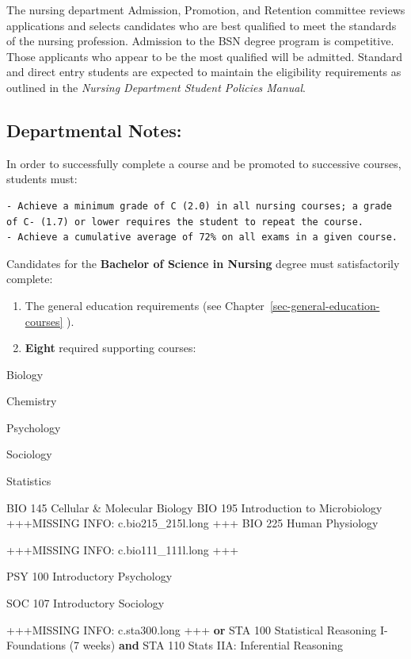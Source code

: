 \documentclass[
  letterpaper,
]{scrbook}
\begin{document}
The nursing department Admission, Promotion, and Retention committee
reviews applications and selects candidates who are best qualified to
meet the standards of the nursing profession. Admission to the BSN
degree program is competitive. Those applicants who appear to be the
most qualified will be admitted. Standard and direct entry students are
expected to maintain the eligibility requirements as outlined in the
\emph{Nursing Department Student Policies Manual}.

\subsection{Departmental Notes:}\label{departmental-notes-1}

In order to successfully complete a course and be promoted to successive
courses, students must:

\begin{verbatim}
- Achieve a minimum grade of C (2.0) in all nursing courses; a grade of C- (1.7) or lower requires the student to repeat the course.
- Achieve a cumulative average of 72% on all exams in a given course.
\end{verbatim}

Candidates for the \textbf{Bachelor of Science in Nursing} degree must
satisfactorily complete:

\begin{enumerate}
\def\labelenumi{\arabic{enumi}.}
\item
  The general education requirements (see
  Chapter~\ref{sec-general-education-courses} ).
\item
  \textbf{Eight} required supporting courses:
\end{enumerate}

Biology

Chemistry

Psychology

Sociology

Statistics

BIO 145 Cellular \& Molecular Biology BIO 195 Introduction to
Microbiology +++MISSING INFO: c.bio215\_215l.long +++ BIO 225 Human
Physiology

+++MISSING INFO: c.bio111\_111l.long +++

PSY 100 Introductory Psychology

SOC 107 Introductory Sociology

+++MISSING INFO: c.sta300.long +++ \textbf{or} STA 100 Statistical
Reasoning I-Foundations (7 weeks) \textbf{and} STA 110 Stats IIA:
Inferential Reasoning
\end{document}
